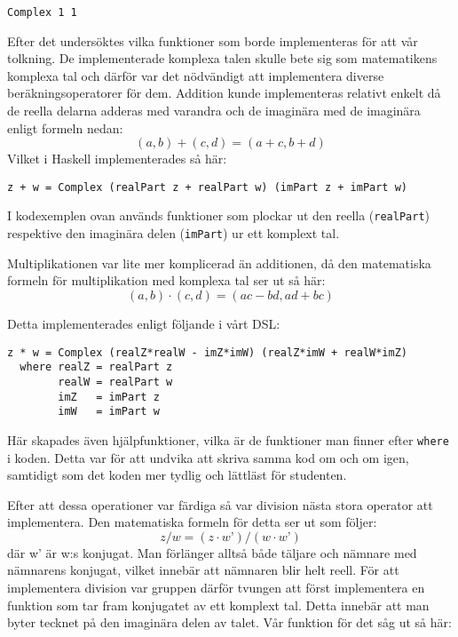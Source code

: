 \documentclass[]{article}
\begin{document}
\begin{verbatim}
Complex 1 1
\end{verbatim}

Efter det undersöktes vilka funktioner som borde implementeras för att vår tolkning. De implementerade komplexa 
talen skulle bete sig som matematikens komplexa tal och därför var det nödvändigt att implementera diverse 
beräkningsoperatorer för dem. Addition kunde implementeras relativt enkelt då de reella delarna adderas med 
varandra och de imaginära med de imaginära enligt formeln nedan: 
\[(a, b) + (c, d) = (a + c, b + d)\] \cite{conway1978functions}
Vilket i Haskell implementerades så här:
\begin{verbatim}
z + w = Complex (realPart z + realPart w) (imPart z + imPart w)
\end{verbatim}

I kodexemplen ovan används funktioner som plockar ut den reella
(\texttt{realPart}) respektive den imaginära delen
(\texttt{imPart}) ur ett komplext tal.




Multiplikationen var lite mer komplicerad än additionen, då den matematiska formeln för multiplikation med komplexa 
tal ser ut så här:
 \[(a, b) \cdot (c, d) = (ac - bd, ad + bc) \] \cite{conway1978functions}
 
Detta implementerades enligt följande i vårt DSL:
\begin{verbatim}
z * w = Complex (realZ*realW - imZ*imW) (realZ*imW + realW*imZ)
  where realZ = realPart z
        realW = realPart w
        imZ   = imPart z
        imW   = imPart w
\end{verbatim}

Här skapades även hjälpfunktioner, vilka är de funktioner man finner efter \texttt{where}
i koden. Detta var för att undvika att skriva samma kod om och om igen, samtidigt som det koden mer tydlig och 
lättläst för studenten.


Efter att dessa operationer var färdiga så var division nästa stora operator att implementera. Den matematiska formeln 
för detta ser ut som följer:
\[ z / w = (z \cdot w’) / (w \cdot w’) \]
där w’ är w:s konjugat.
Man förlänger alltså både täljare och nämnare med nämnarens konjugat, vilket innebär att nämnaren 
blir helt reell. För att implementera division var gruppen därför tvungen att först implementera en 
funktion som tar fram konjugatet av ett komplext tal. Detta innebär att man byter tecknet på den imaginära 
delen av talet. Vår funktion för det såg ut så här:
\end{document}
